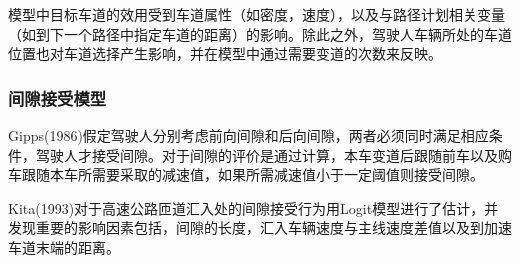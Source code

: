 模型中目标车道的效用受到车道属性（如密度，速度），以及与路径计划相关变量（如到下一个路径中指定车道的距离）的影响。除此之外，驾驶人车辆所处的车道位置也对车道选择产生影响，并在模型中通过需要变道的次数来反映。

\subsubsection{间隙接受模型}

Gipps(1986)假定驾驶人分别考虑前向间隙和后向间隙，两者必须同时满足相应条件，驾驶人才接受间隙。对于间隙的评价是通过计算，本车变道后跟随前车以及购车跟随本车所需要采取的减速值，如果所需减速值小于一定阈值则接受间隙\cite{Gipps1986}。

Kita(1993)对于高速公路匝道汇入处的间隙接受行为用Logit模型进行了估计，并发现重要的影响因素包括，间隙的长度，汇入车辆速度与主线速度差值以及到加速车道末端的距离\cite{Kita1993}。

